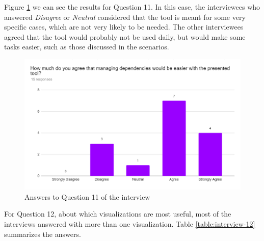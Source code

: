 Figure \ref{fig:interview-11} we can see the results for Question 11. In this case, the interviewees who answered \textit{Disagree} or \textit{Neutral} considered that the tool is meant for some very specific cases, which are not very likely to be needed. The other interviewees agreed that the tool would probably not be used daily, but would make some tasks easier, such as those discussed in the scenarios.

\begin{figure}[ht!]
\begin{center}
\includegraphics[width=\textwidth]{figures/interview/Question11.png}
\caption{Answers to Question 11 of the interview}
\label{fig:interview-11}
\end{center}
\end{figure}

For Question 12, about which visualizations are most useful, most of the interviews answered with more than one visualization. Table \ref{table:interview-12} summarizes the answers.

